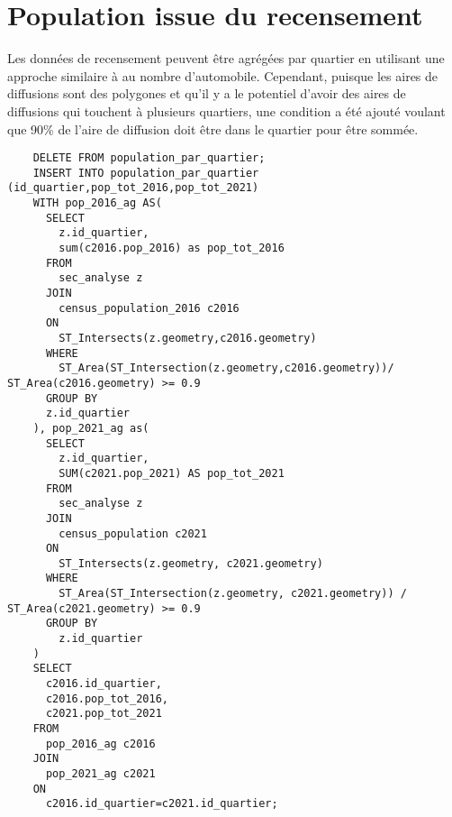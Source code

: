 \section{Population issue du recensement}\label{sec:annexe_pop_quartiers}
Les données de recensement peuvent être agrégées par quartier en utilisant une approche similaire à au nombre d'automobile. Cependant, puisque les aires de diffusions sont des polygones et qu'il y a le potentiel d'avoir des aires de diffusions qui touchent à plusieurs quartiers, une condition a été ajouté voulant que 90\% de l'aire de diffusion doit être dans le quartier pour être sommée. 
\begin{lstlisting}
    DELETE FROM population_par_quartier;
    INSERT INTO population_par_quartier (id_quartier,pop_tot_2016,pop_tot_2021)
    WITH pop_2016_ag AS(
      SELECT 
        z.id_quartier,
        sum(c2016.pop_2016) as pop_tot_2016
      FROM
        sec_analyse z
      JOIN 
        census_population_2016 c2016
      ON 
        ST_Intersects(z.geometry,c2016.geometry)
      WHERE
        ST_Area(ST_Intersection(z.geometry,c2016.geometry))/ ST_Area(c2016.geometry) >= 0.9
      GROUP BY
      z.id_quartier
    ), pop_2021_ag as(
      SELECT
        z.id_quartier,
        SUM(c2021.pop_2021) AS pop_tot_2021
      FROM
        sec_analyse z
      JOIN
        census_population c2021
      ON
        ST_Intersects(z.geometry, c2021.geometry)
      WHERE
        ST_Area(ST_Intersection(z.geometry, c2021.geometry)) / ST_Area(c2021.geometry) >= 0.9
      GROUP BY
        z.id_quartier
    )
    SELECT
      c2016.id_quartier,
      c2016.pop_tot_2016,
      c2021.pop_tot_2021
    FROM
      pop_2016_ag c2016
    JOIN
      pop_2021_ag c2021
    ON
      c2016.id_quartier=c2021.id_quartier;
\end{lstlisting}

